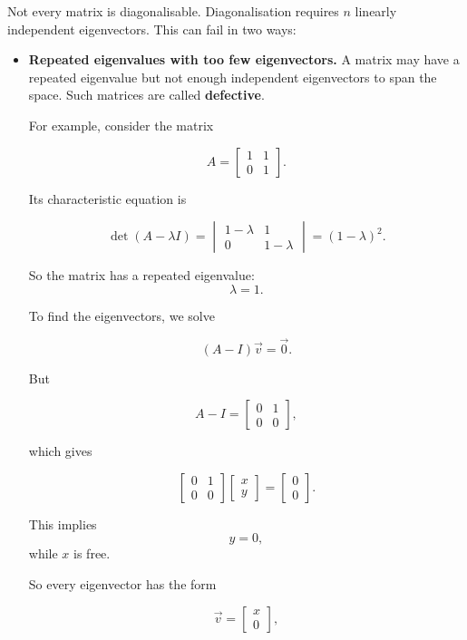 \documentclass[11pt,openany]{book}
\theoremstyle{definition}
\begin{document}
Not every matrix is diagonalisable. Diagonalisation requires $n$ linearly
independent eigenvectors. This can fail in two ways:

\begin{itemize}
  \item \textbf{Repeated eigenvalues with too few eigenvectors.} A matrix may
have a repeated eigenvalue but not enough independent eigenvectors to span the
space. Such matrices are called \textbf{defective}.

\medskip

For example, consider the matrix

\[
A =
\begin{bmatrix}
1 & 1 \\
0 & 1
\end{bmatrix}.
\]

Its characteristic equation is

\[
\det(A - \lambda I)
=
\begin{vmatrix}
1-\lambda & 1 \\
0 & 1-\lambda
\end{vmatrix}
=
(1-\lambda)^2.
\]

So the matrix has a repeated eigenvalue:
\[
\lambda = 1.
\]

\medskip

To find the eigenvectors, we solve

\[
(A-I)\vec{v} = \vec{0}.
\]

But

\[
A-I =
\begin{bmatrix}
0 & 1 \\
0 & 0
\end{bmatrix},
\]

which gives

\[
\begin{bmatrix}
0 & 1 \\
0 & 0
\end{bmatrix}
\begin{bmatrix}
x \\
y
\end{bmatrix}
=
\begin{bmatrix}
0 \\
0
\end{bmatrix}.
\]

This implies
\[
y = 0,
\]
while $x$ is free.

\medskip

So every eigenvector has the form

\[
\vec{v} =
\begin{bmatrix}
x \\
0
\end{bmatrix},
\]


\end{itemize}
\end{document}
